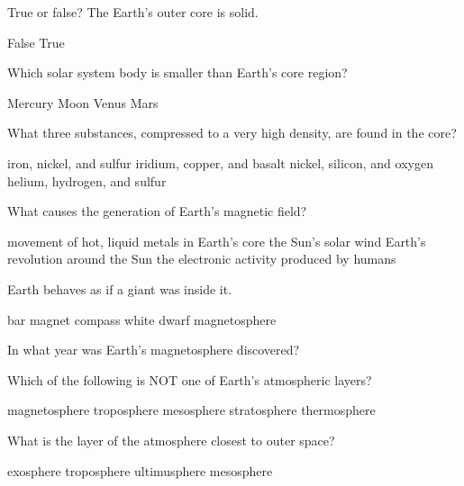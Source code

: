 \documentclass{exam}
\begin{document}
\begin{questions}
\question
True or false? The Earth's outer core is solid.

\begin{randomizechoices}
    \correctchoice False
    \choice True
\end{randomizechoices}

\clearpage
\question
Which solar system body is smaller than Earth's core region?

\begin{randomizechoices}
    \correctchoice Mercury
    \choice Moon
    \choice Venus
    \choice Mars
\end{randomizechoices}

\question
What three substances, compressed to a very high density, are found in the core?

\begin{randomizechoices}
    \correctchoice iron, nickel, and sulfur
    \choice iridium, copper, and basalt
    \choice nickel, silicon, and oxygen
    \choice helium, hydrogen, and sulfur
\end{randomizechoices}

\question
What causes the generation of Earth's magnetic field?

\begin{randomizechoices}
    \correctchoice movement of hot, liquid metals in Earth's core
    \choice the Sun's solar wind
    \choice Earth's revolution around the Sun
    \choice the electronic activity produced by humans
\end{randomizechoices}

\question
Earth behaves as if a giant  was inside it. 

\begin{randomizechoices}
    \correctchoice bar magnet
    \choice compass
    \choice white dwarf
    \choice magnetosphere
\end{randomizechoices}

\question
In what year was Earth's magnetosphere discovered?

\begin{randomizechoices}
\end{randomizechoices}

\question
Which of the following is NOT one of Earth's atmospheric layers?

\begin{randomizechoices}
    \correctchoice magnetosphere
    \choice troposphere
    \choice mesosphere
    \choice stratosphere
    \choice thermosphere
\end{randomizechoices}

\question
What is the layer of the atmosphere closest to outer space?

\begin{randomizechoices}
    \correctchoice exosphere
    \choice troposphere
    \choice ultimusphere
    \choice mesosphere
\end{randomizechoices}





\end{questions}
\end{document}
